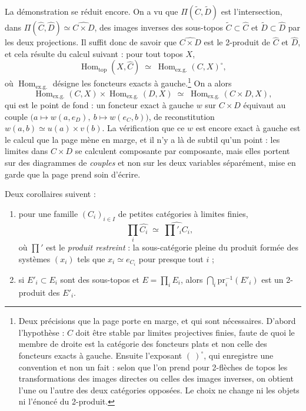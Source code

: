 \documentclass[11pt,a4paper]{article}
\begin{document}
La démonstration se réduit encore. On a vu que
$\Pi(\widetilde{C}, \widetilde{D})$ est l'intersection, dans
$\Pi(\widehat{C}, \widehat{D}) \simeq \widehat{C \times D}$, des images
inverses des sous-topos $\widetilde{C} \subset \widehat{C}$ et
$\widetilde{D} \subset \widehat{D}$ par les deux projections. Il suffit donc de
savoir que $\widehat{C \times D}$ est le 2-produit de $\widehat{C}$ et
$\widehat{D}$, et cela résulte du calcul suivant : pour tout topos $X$,
\[
\operatorname{Hom}_{\mathrm{top}}(X, \widehat{C}) \;\simeq\;
\operatorname{Hom}_{\mathrm{ex.g.}}(C, X)^{\circ},
\]
où $\operatorname{Hom}_{\mathrm{ex.g.}}$ désigne les foncteurs exacts à
gauche.\footnote{Deux précisions que la page porte en marge, et qui sont
nécessaires. D'abord l'hypothèse : $C$ doit être stable par limites projectives
finies, faute de quoi le membre de droite est la catégorie des foncteurs plats
et non celle des foncteurs exacts à gauche. Ensuite l'exposant $(\ )^{\circ}$,
qui enregistre une convention et non un fait : selon que l'on prend pour
2-flèches de topos les transformations des images directes ou celles des images
inverses, on obtient l'une ou l'autre des deux catégories opposées. Le choix ne
change ni les objets ni l'énoncé du 2-produit.} On a alors
\[
\operatorname{Hom}_{\mathrm{ex.g.}}(C, X) \times
\operatorname{Hom}_{\mathrm{ex.g.}}(D, X) \;\simeq\;
\operatorname{Hom}_{\mathrm{ex.g.}}(C \times D, X),
\]
qui est le point de fond : un foncteur exact à gauche $w$ sur $C \times D$
équivaut au couple $\bigl(a \mapsto w(a, e_{D}),\ b \mapsto w(e_{C}, b)\bigr)$,
de reconstitution $w(a,b) \simeq u(a) \times v(b)$. La vérification que ce $w$
est encore exact à gauche est le calcul que la page mène en marge, et il n'y a
là de subtil qu'un point : les limites dans $C \times D$ se calculent
composante par composante, mais elles portent sur des diagrammes de
\emph{couples} et non sur les deux variables séparément, mise en garde que la
page prend soin d'écrire.

Deux corollaires suivent :

\begin{enumerate}
\item[a)] pour une famille $(C_{i})_{i \in I}$ de petites catégories à limites
finies,
\[
\prod_{i} \widehat{C_{i}} \;\simeq\; \widehat{\textstyle\prod'_{i} C_{i}},
\]
où $\prod'$ est le \emph{produit restreint} : la sous-catégorie pleine du
produit formée des systèmes $(x_{i})$ tels que $x_{i} \simeq e_{C_{i}}$ pour
presque tout $i$ ;
\item[b)] si $E'_{i} \subset E_{i}$ sont des sous-topos et $E = \prod_{i} E_{i}$,
alors $\bigcap_{i} \mathrm{pr}_{i}^{-1}(E'_{i})$ est un 2-produit des $E'_{i}$.
\end{enumerate}
\end{document}
